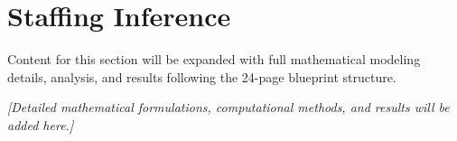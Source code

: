 \section{Staffing Inference}

Content for this section will be expanded with full mathematical modeling details, analysis, and results following the 24-page blueprint structure.

\vspace{0.5cm}

\noindent \textit{[Detailed mathematical formulations, computational methods, and results will be added here.]}
